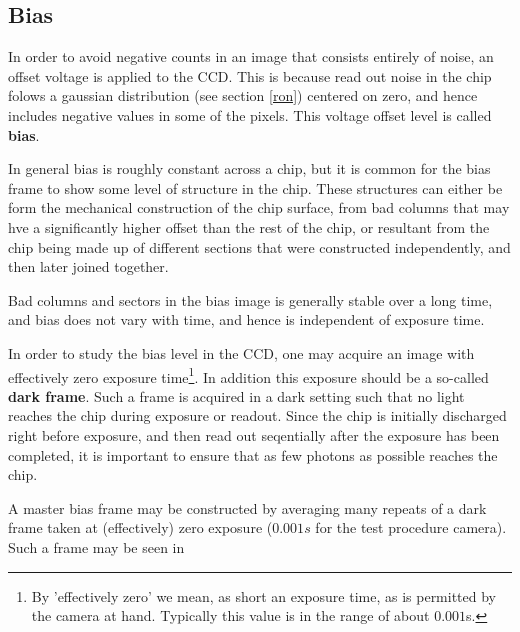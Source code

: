 \documentclass[../main.tex]{subfiles}
\begin{document}
	\subsection{Bias}
	In order to avoid negative counts in an image that consists entirely of noise, an offset voltage is applied to the CCD. This is because read out noise in the chip folows a gaussian distribution (see section \ref{ron}) centered on zero, and hence includes negative values in some of the pixels. This voltage offset level is called \textbf{bias}. 
	
	In general bias is roughly constant across a chip, but it is common for the bias frame to show some level of structure in the chip. These structures can either be form the mechanical construction of the chip surface, from bad columns that may hve a significantly higher offset than the rest of the chip, or resultant from the chip being made up of different sections that were constructed independently, and then later joined together. 
	
	Bad columns and sectors in the bias image is generally stable over a long time, and bias does not vary with time, and hence is independent of exposure time. 
	
	In order to study the bias level in the CCD, one may acquire an image with effectively zero exposure time\footnote{By 'effectively zero' we mean, as short an exposure time, as is permitted by the camera at hand. Typically this value is in the range of about $0.001$s.}. In addition this exposure should be a so-called \textbf{dark frame}. Such a frame is acquired in a dark setting such that no light reaches the chip during exposure or readout. Since the chip is initially discharged right before exposure, and then read out seqentially after the exposure has been completed, it is important to ensure that as few photons as possible reaches the chip.
	
	A master bias frame may be constructed by averaging many repeats of a dark frame taken at (effectively) zero exposure ($0.001s$ for the test procedure camera). Such a frame may be seen in 
	
\end{document}
